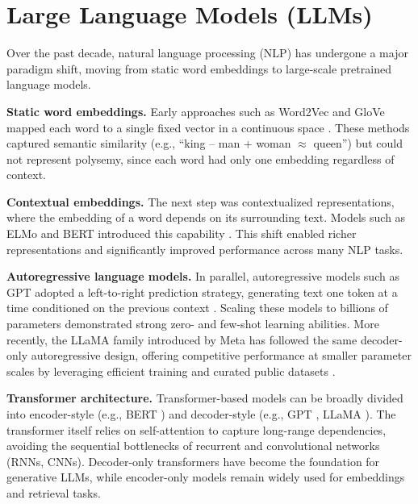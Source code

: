 
\section{Large Language Models (LLMs)}

Over the past decade, natural language processing (NLP) has undergone a major paradigm shift, moving from static word embeddings to large-scale pretrained language models.  

\textbf{Static word embeddings.} Early approaches such as Word2Vec and GloVe mapped each word to a single fixed vector in a continuous space \parencite{mikolov2013word2vec}\parencite{pennington2014glove}. These methods captured semantic similarity (e.g., “king – man + woman $\approx$
 queen”) but could not represent polysemy, since each word had only one embedding regardless of context.  

\textbf{Contextual embeddings.} The next step was contextualized representations, where the embedding of a word depends on its surrounding text. Models such as ELMo and BERT introduced this capability \parencite{peters2018elmo}\parencite{devlin2019bert}. This shift enabled richer representations and significantly improved performance across many NLP tasks.  

\textbf{Autoregressive language models.} In parallel, autoregressive models such as GPT adopted a left-to-right prediction strategy, generating text one token at a time conditioned on the previous context \parencite{radford2018improving}\parencite{brown2020language}. Scaling these models to billions of parameters demonstrated strong zero- and few-shot learning abilities. More recently, the LLaMA family introduced by Meta has followed the same decoder-only autoregressive design, offering competitive performance at smaller parameter scales by leveraging efficient training and curated public datasets \parencite{touvron_llama_2023}\parencite{touvron2023llama2}.  

\textbf{Transformer architecture.} Transformer-based models can be broadly divided into encoder-style (e.g., BERT \parencite{devlin2019bert}) and decoder-style (e.g., GPT \parencite{radford2018improving}\parencite{brown2020language}, LLaMA \parencite{touvron_llama_2023}). The transformer itself \parencite{vaswani2017attention} relies on self-attention to capture long-range dependencies, avoiding the sequential bottlenecks of recurrent and convolutional networks (RNNs, CNNs). Decoder-only transformers have become the foundation for generative LLMs, while encoder-only models remain widely used for embeddings and retrieval tasks.  

